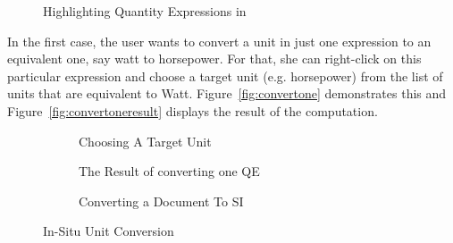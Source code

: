 \begin{figure}[ht]
    \caption{Highlighting Quantity Expressions in \cite{physics/9807021}}\label{fig:highlight}
\end{figure}

In the first case, the user wants to convert a unit in just one expression to an equivalent one, say watt to horsepower.
For that, she can right-click on this particular expression and choose a target unit (e.g.  horsepower) from the list of units that are equivalent to Watt.
Figure~\ref{fig:convertone} demonstrates this and Figure~\ref{fig:convertoneresult} displays the result of the computation.

\begin{figure}
  \begin{subfigure}{\textwidth}
    \caption{Choosing A Target Unit}\label{fig:convertone}
    \caption{The Result of converting one QE}\label{fig:convertoneresult}
    \caption{Converting a Document To SI}\label{fig:si}
  \end{subfigure}
  \caption{In-Situ Unit Conversion}\label{fig:unit-conversion}
\end{figure}

